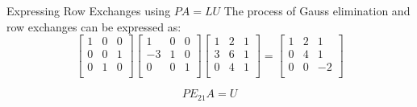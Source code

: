 \documentclass{beamer}
\begin{document}
\begin{frame}{Expressing Row Exchanges using $PA=LU$}
The process of Gauss elimination and row exchanges can be expressed as:
\begin{equation*}
    \left[ \begin{matrix}
        1&		0&		0\\
        0&		0&		1\\
        0&		1&		0\\
    \end{matrix} \right] \left[ \begin{matrix}
        1&		0&		0\\
        -3&		1&		0\\
        0&		0&		1\\
    \end{matrix} \right] \left[ \begin{matrix}
        1&		2&		1\\
        3&		6&		1\\
        0&		4&		1\\
    \end{matrix} \right] =\left[ \begin{matrix}
        1&		2&		1\\
        0&		4&		1\\
        0&		0&		-2\\
    \end{matrix} \right]
\end{equation*}

\begin{equation*}
    PE_{21}A=U
\end{equation*}

\end{frame}
\end{document}
